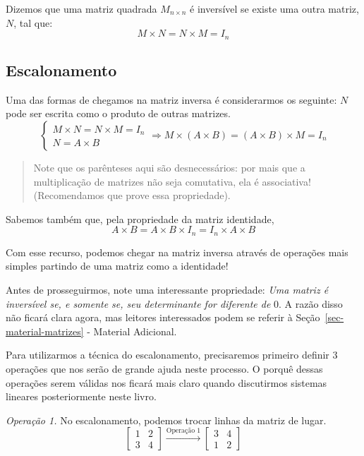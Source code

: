 \documentclass[
  letterpaper,
  DIV=11,
  numbers=noendperiod]{scrreprt}
\begin{document}
Dizemos que uma matriz quadrada \(M_{n\times n}\) é inversível se existe
uma outra matriz, \(N\), tal que: \[
    M\times N = N \times M = I_n
\]

\subsection{Escalonamento}\label{escalonamento}

Uma das formas de chegamos na matriz inversa é considerarmos os
seguinte: \(N\) pode ser escrita como o produto de outras matrizes. \[
\begin{cases}
    M \times N = N \times M = I_{n} \\
    N = {A \times B}
\end{cases}\Rightarrow M \times (A \times B) = (A\times B) \times M = I_n 
\]

\begin{quote}
Note que os parênteses aqui são desnecessários: por mais que a
multiplicação de matrizes não seja comutativa, ela é associativa!
(Recomendamos que prove essa propriedade).
\end{quote}

Sabemos também que, pela propriedade da matriz identidade, \[
A \times B = A \times B \times I_n = I_n \times A \times B
\]

Com esse recurso, podemos chegar na matriz inversa através de operações
mais simples partindo de uma matriz como a identidade!

Antes de prosseguirmos, note uma interessante propriedade: \emph{Uma
matriz é inversível se, e somente se, seu determinante for diferente de}
\(0\). A razão disso não ficará clara agora, mas leitores interessados
podem se referir à Seção~\ref{sec-material-matrizes} - Material
Adicional.

Para utilizarmos a técnica do escalonamento, precisaremos primeiro
definir 3 operações que nos serão de grande ajuda neste processo. O
porquê dessas operações serem válidas nos ficará mais claro quando
discutirmos sistemas lineares posteriormente neste livro.

\emph{Operação 1.} No escalonamento, podemos trocar linhas da matriz de
lugar. \[
\begin{bmatrix}
    1 & 2 \\
    3 & 4
\end{bmatrix} \stackrel{\text{Operação 1}}{\rightarrow}
\begin{bmatrix}
    3 & 4 \\
    1 & 2
\end{bmatrix}
\]
\end{document}
